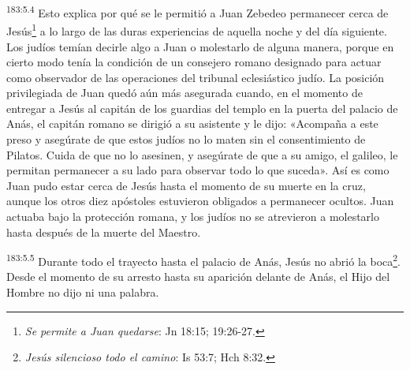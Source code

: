 \par
\textsuperscript{183:5.4} Esto explica por qué se le permitió a Juan Zebedeo permanecer cerca de Jesús\footnote{\textit{Se permite a Juan quedarse}: Jn 18:15; 19:26-27.} a lo largo de las duras experiencias de aquella noche y del día siguiente. Los judíos temían decirle algo a Juan o molestarlo de alguna manera, porque en cierto modo tenía la condición de un consejero romano designado para actuar como observador de las operaciones del tribunal eclesiástico judío. La posición privilegiada de Juan quedó aún más asegurada cuando, en el momento de entregar a Jesús al capitán de los guardias del templo en la puerta del palacio de Anás, el capitán romano se dirigió a su asistente y le dijo: «Acompaña a este preso y asegúrate de que estos judíos no lo maten sin el consentimiento de Pilatos. Cuida de que no lo asesinen, y asegúrate de que a su amigo, el galileo, le permitan permanecer a su lado para observar todo lo que suceda». Así es como Juan pudo estar cerca de Jesús hasta el momento de su muerte en la cruz, aunque los otros diez apóstoles estuvieron obligados a permanecer ocultos. Juan actuaba bajo la protección romana, y los judíos no se atrevieron a molestarlo hasta después de la muerte del Maestro.

\par
\textsuperscript{183:5.5} Durante todo el trayecto hasta el palacio de Anás, Jesús no abrió la boca\footnote{\textit{Jesús silencioso todo el camino}: Is 53:7; Hch 8:32.}. Desde el momento de su arresto hasta su aparición delante de Anás, el Hijo del Hombre no dijo ni una palabra.